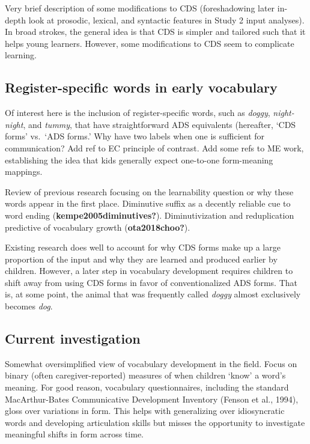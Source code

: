 \documentclass[10pt, letterpaper]{article}
\begin{document}
Very brief description of some modifications to CDS (foreshadowing later
in-depth look at prosodic, lexical, and syntactic features in Study 2
input analyses). In broad strokes, the general idea is that CDS is
simpler and tailored such that it helps young learners. However, some
modifications to CDS seem to complicate learning.

\hypertarget{register-specific-words-in-early-vocabulary}{%
\subsection{Register-specific words in early
vocabulary}\label{register-specific-words-in-early-vocabulary}}

Of interest here is the inclusion of register-specific words, such as
\emph{doggy}, \emph{night-night}, and \emph{tummy}, that have
straightforward ADS equivalents (hereafter, `CDS forms' vs.~`ADS forms.'
Why have two labels when one is sufficient for communication? Add ref to
EC principle of contrast. Add some refs to ME work, establishing the
idea that kids generally expect one-to-one form-meaning mappings.

Review of previous research focusing on the learnability question or why
these words appear in the first place. Diminutive suffix as a decently
reliable cue to word ending (\textbf{kempe2005diminutives?}).
Diminutivization and reduplication predictive of vocabulary growth
(\textbf{ota2018choo?}).

Existing research does well to account for why CDS forms make up a large
proportion of the input and why they are learned and produced earlier by
children. However, a later step in vocabulary development requires
children to shift away from using CDS forms in favor of conventionalized
ADS forms. That is, at some point, the animal that was frequently called
\emph{doggy} almost exclusively becomes \emph{dog}.

\hypertarget{current-investigation}{%
\subsection{Current investigation}\label{current-investigation}}

Somewhat oversimplified view of vocabulary development in the field.
Focus on binary (often caregiver-reported) measures of when children
`know' a word's meaning. For good reason, vocabulary questionnaires,
including the standard MacArthur-Bates Communicative Development
Inventory (Fenson et al., 1994), gloss over variations in form. This
helps with generalizing over idiosyncratic words and developing
articulation skills but misses the opportunity to investigate meaningful
shifts in form across time.
\end{document}
